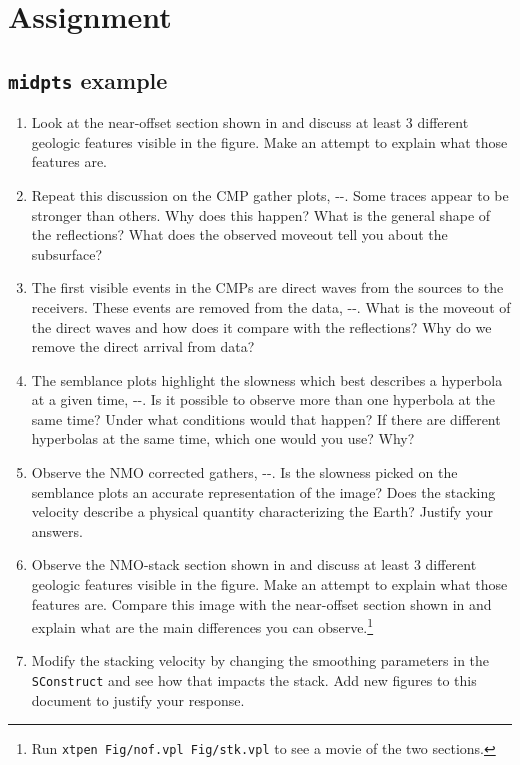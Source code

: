 \section{Assignment}

\subsection{\texttt{midpts} example}
\begin{enumerate}
\item Look at the near-offset section shown in  and discuss
  at least $3$ different geologic features visible in the figure. Make
  an attempt to explain what those features are.
\item Repeat this discussion on the CMP gather plots,
  --. Some traces appear to be
  stronger than others. Why does this happen? What is the general
  shape of the reflections? What does the observed moveout tell you
  about the subsurface?
\item The first visible events in the CMPs are direct waves from the
  sources to the receivers. These events are removed from the data,
  --. What is the moveout of the
  direct waves and how does it compare with the reflections? Why do we
  remove the direct arrival from data?
\item The semblance plots highlight the slowness which best describes
  a hyperbola at a given time,
  --. Is it possible to observe
  more than one hyperbola at the same time? Under what conditions
  would that happen?  If there are different hyperbolas at the same
  time, which one would you use? Why?
\item Observe the NMO corrected gathers,
  --. Is the slowness picked on
  the semblance plots an accurate representation of the image? Does
  the stacking velocity describe a physical quantity characterizing
  the Earth? Justify your answers.
\item Observe the NMO-stack section shown in  and discuss at
  least $3$ different geologic features visible in the figure. Make an
  attempt to explain what those features are. Compare this image with
  the near-offset section shown in  and explain what are the
  main differences you can observe.\footnote{Run \texttt{xtpen
      Fig/nof.vpl Fig/stk.vpl} to see a movie of the two sections.}
\item Modify the stacking velocity by changing the smoothing
  parameters in the \texttt{SConstruct} and see how that impacts the
  stack. Add new figures to this document to justify your response.
\end{enumerate}

